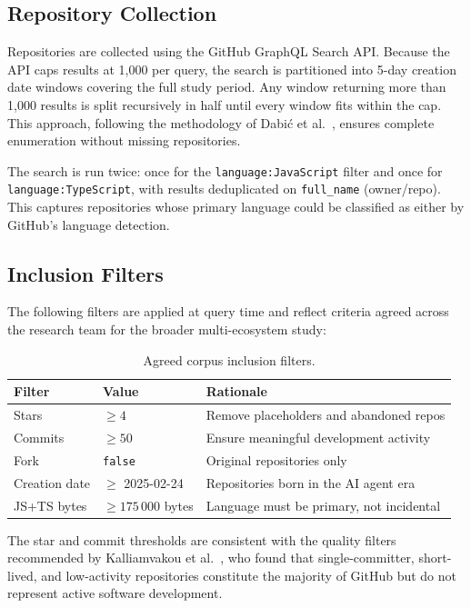 \documentclass[12pt, a4paper]{article}
\begin{document}
\subsection{Repository Collection}

Repositories are collected using the GitHub GraphQL Search API. Because the
API caps results at 1,000 per query, the search is partitioned into 5-day
creation date windows covering the full study period. Any window returning
more than 1,000 results is split recursively in half until every window fits
within the cap. This approach, following the methodology of Dabi\'c et
al.~\cite{dabic2021}, ensures complete enumeration without missing
repositories.

The search is run twice: once for the \texttt{language:JavaScript} filter and
once for \texttt{language:TypeScript}, with results deduplicated on
\texttt{full\_name} (owner/repo). This captures repositories whose primary
language could be classified as either by GitHub's language detection.

\subsection{Inclusion Filters}

The following filters are applied at query time and reflect criteria agreed
across the research team for the broader multi-ecosystem study:

\begin{table}[h]
\centering
\caption{Agreed corpus inclusion filters.}
\begin{tabular}{@{}lll@{}}
\toprule
\textbf{Filter} & \textbf{Value} & \textbf{Rationale} \\
\midrule
Stars           & $\geq 4$              & Remove placeholders and abandoned repos \\
Commits         & $\geq 50$             & Ensure meaningful development activity \\
Fork            & \texttt{false}        & Original repositories only \\
Creation date   & $\geq$ 2025-02-24     & Repositories born in the AI agent era \\
JS+TS bytes     & $\geq 175\,000$ bytes & Language must be primary, not incidental \\
\bottomrule
\end{tabular}
\end{table}

The star and commit thresholds are consistent with the quality filters
recommended by Kalliamvakou et al.~\cite{kalliamvakou2016}, who found that
single-committer, short-lived, and low-activity repositories constitute the
majority of GitHub but do not represent active software development.
\end{document}
